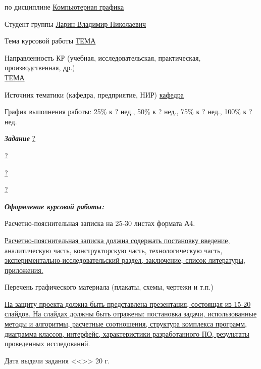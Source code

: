 \normalsize
\begin{flushleft}
    \fontsize{11pt}{0.5\baselineskip}\selectfont
    \setlength{\parskip}{0.1em}
    по дисциплине \uline{\hfill Компьютерная графика \hfill}

    Студент группы \uline{\hfill Ларин Владимир Николаевич \hfill}

    Тема курсовой работы \uline{\hfill ТЕМА \hfill}

    Направленность КР (учебная, исследовательская, практическая, производственная, др.) \\
    \uline{\hfill ТЕМА \hfill}

    Источник тематики (кафедра, предприятие, НИР) \uline{\hfill кафедра \hfill}

    График выполнения работы:  25\% к \uline{?} нед., 50\% к \uline{?} нед., 75\% к \uline{?} нед., 100\% к \uline{?} нед.

    \textbf{\textit{Задание}}
    \uline{\hfill ? \hfill}

    \uline{\hfill ? \hfill}

    \uline{\hfill ? \hfill}

    \uline{\hfill ? \hfill}

    \textbf{\textit{Оформление курсовой работы:}}

    Расчетно-пояснительная записка на 25-30  листах формата А4.
    
    \uline{
        Расчетно-пояснительная записка должна содержать постановку введение, аналитическую часть, конструкторскую часть, технологическую часть, экспериментально-исследовательский раздел, заключение, список литературы, приложения.
    }


    Перечень графического материала (плакаты, схемы, чертежи и т.п.)

    \uline{На защиту проекта должна быть представлена презентация, состоящая из 15-20 слайдов. На слайдах должны быть отражены: постановка задачи, использованные методы и алгоритмы, расчетные соотношения, структура комплекса программ, диаграмма классов, интерфейс, характеристики разработанного ПО, результаты проведенных исследований.
    }

    Дата выдачи задания <<\uline{\hspace*{5mm}}>> \uline{\hspace*{2.5cm}} 20\uline{\hspace*{5mm}} г.
\end{flushleft}


\vfill

